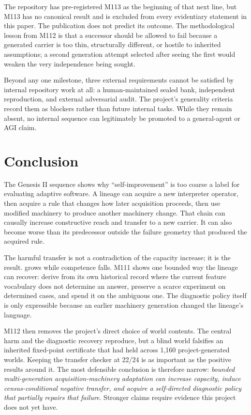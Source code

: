 The repository has pre-registered M113 as the beginning of that next line, but M113 has no canonical result and is excluded from every evidentiary statement in this paper. The publication does not predict its outcome. The methodological lesson from M112 is that a successor should be allowed to fail because a generated carrier is too thin, structurally different, or hostile to inherited assumptions; a second generation attempt selected after seeing the first would weaken the very independence being sought.

Beyond any one milestone, three external requirements cannot be satisfied by internal repository work at all: a human-maintained sealed bank, independent reproduction, and external adversarial audit. The project's generality criteria record them as blockers rather than future internal tasks. While they remain absent, no internal sequence can legitimately be promoted to a general-agent or AGI claim.

\section{Conclusion}
The Genesis II sequence shows why ``self-improvement'' is too coarse a label for evaluating adaptive software. A lineage can acquire a new interpreter operator, then acquire a rule that changes how later acquisition proceeds, then use modified machinery to produce another machinery change. That chain can causally increase constructive reach and transfer to a new carrier. It can also become worse than its predecessor outside the failure geometry that produced the acquired rule.

The harmful transfer is not a contradiction of the capacity increase; it is the result. \reach grows while competence falls. M111 shows one bounded way the lineage can recover: derive from its own historical record where the current feature vocabulary does not determine an answer, preserve a scarce experiment on determined cases, and spend it on the ambiguous one. The diagnostic policy itself is only expressible because an earlier machinery generation changed the lineage's language.

M112 then removes the project's direct choice of world contents. The central harm and the diagnostic recovery reproduce, but a blind world falsifies an inherited fixed-point certificate that had held across 1,160 project-generated worlds. Keeping the transfer checker at 22/24 is as important as the positive results around it. The most defensible conclusion is therefore narrow: \emph{bounded multi-generation acquisition-machinery adaptation can increase capacity, induce census-conditional negative transfer, and acquire a self-directed diagnostic policy that partially repairs that failure}. Stronger claims require evidence this project does not yet have.

